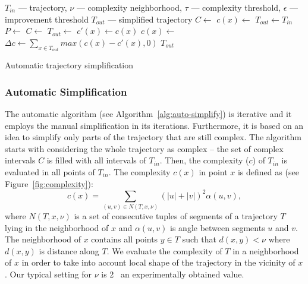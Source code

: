 \begin{algorithm}
  \begin{algorithmic}[1]
	  \Require $T_{in}$ --- trajectory, $\nu$ --- complexity neighborhood, $\tau$ --- complexity threshold, $\epsilon$ --- improvement threshold
	  \Ensure $T_{out}$ --- simplified trajectory
			\State $C \gets$  
			\State $c(x) \gets$ 
			\State
			\State $T_{out} \gets T_{in}$
			\Repeat
			  \State $P \gets$ 
				\State $C \gets$ 
			  \State
					\State $T_{out} \gets$ 
			  \EndFor
				\State
				\State $c'(x) \gets c(x)$ %
				\State $c(x) \gets$ 
				\State
				\State $\Delta c \gets \sum_{x \in T_{out}}{max(c(x) - c'(x), 0)}$
				\State {}
			\State
			\State \Return $T_{out}$
		\EndProcedure
  \end{algorithmic}
	\caption{Automatic trajectory simplification}
  \label{alg:auto-simplify}
\end{algorithm}

\subsubsection*{Automatic Simplification}

The automatic algorithm (see Algorithm~\ref{alg:auto-simplify}) is iterative and it employs the manual simplification in its iterations.
Furthermore, it is based on an idea to simplify only parts of the trajectory that are still complex.
The algorithm starts with considering the whole trajectory as complex -- the set of complex intervals $C$ is filled with all intervals of $T_{in}$.
Then, the complexity ($c$) of $T_{in}$ is evaluated in all points of $T_{in}$.
The complexity $c(x)$ in point $x$ is defined as (see Figure~\ref{fig:complexity}):
\begin{equation}
  c(x) = \sum_{(u, v) \in N(T, x, \nu)}{(|u| + |v|)^2 \alpha(u, v)}, %
\label{eq:complexity}
\end{equation}
where $N(T, x, \nu)$ is a set of consecutive tuples of segments of a trajectory $T$ lying in the neighborhood of $x$ and $\alpha(u, v)$ is angle between segments $u$ and $v$.
The neighborhood of $x$ contains all points $y \in T$ such that $d(x, y) < \nu$ where $d(x, y)$ is distance along $T$.
We evaluate the complexity of $T$ in a neighborhood of $x$ in order to take into account local shape of the trajectory in the vicinity of $x$.
Our typical setting for $\nu$ is 2 \angstrom\, an experimentally obtained value.

